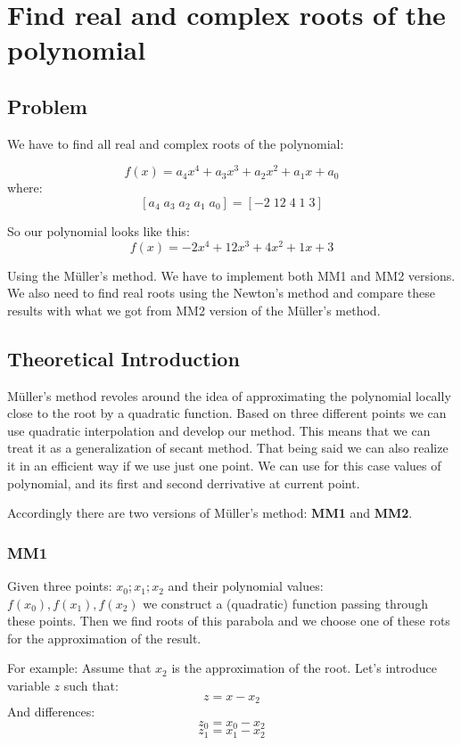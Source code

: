\documentclass[12pt]{report}
\begin{document}
\chapter{Find real and complex roots of the polynomial}

\section{Problem}

We have to find all real and complex roots of the polynomial:

\[ f(x) = a_4x^4+a_3x^3+a_2x^2+a_1x+a_0 \]
where:
\[ [a_4 \; a_3 \; a_2 \; a_1 \; a_0] = [-2 \; 12 \; 4 \; 1 \; 3] \]

So our polynomial looks like this:
\[ f(x) = -2x^4+12x^3+4x^2+1x+3 \]

Using the M{\"u}ller's method. We have to implement both MM1 and MM2 versions. We also need to find real roots using the Newton's method and compare these results with what we got from MM2 version of the M{\"u}ller's method.
\section{Theoretical Introduction}
M{\"u}ller's method revoles around the idea of approximating the polynomial locally close to the root by a quadratic function. Based on three different points we can use quadratic interpolation and develop our method. This means that we can treat it as a generalization of secant method. That being said we can also realize it in an efficient way if we use just one point. We can use for this case values of polynomial, and its first and second derrivative at current point.

Accordingly there are two versions of M{\"u}ller's method: \textbf{MM1} and \textbf{MM2}.

\subsection{MM1}
Given three points: $x_0; x_1; x_2$ and their polynomial values: $f(x_0), f(x_1), f(x_2)$ we construct a (quadratic) function passing through these points. Then we find roots of this parabola and we choose one of these rots for the approximation of the result.

For example:
Assume that $x_2$ is the approximation of the root.
Let's introduce variable $z$ such that:
\[ z = x - x_2 \]
And differences:
\[ z_0 = x_0 - x_2 \]
\[ z_1 = x_1 - x_2 \]
\end{document}
